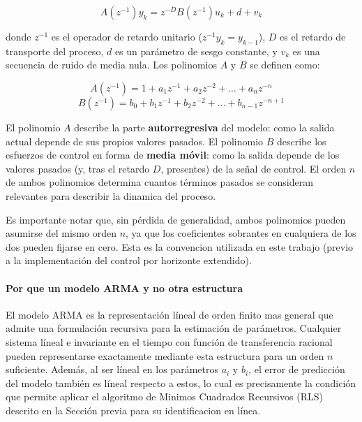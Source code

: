 \begin{equation}
    A(z^{-1})y_k = z^{-D}B(z^{-1})u_k + d + v_k
    \label{eq:arma}
\end{equation}

donde $z^{-1}$ es el operador de retardo unitario ($z^{-1}y_k = y_{k-1}$), $D$ es el retardo de transporte del proceso, $d$ es un parámetro de sesgo constante, y $v_k$ es una secuencia de ruido de media nula. Los polinomios $A$ y $B$ se definen como:

\begin{equation}
    A(z^{-1}) = 1 + a_1 z^{-1} + a_2 z^{-2} + \ldots + a_n z^{-n}
\end{equation}
\begin{equation}
    B(z^{-1}) = b_0 + b_1 z^{-1} + b_2 z^{-2} + \ldots + b_{n-1} z^{-n+1}
\end{equation}

El polinomio $A$ describe la parte \textbf{autorregresiva} del modelo: como la salida actual depende de sus propios valores pasados. El polinomio $B$ describe los esfuerzos de control en forma de \textbf{media móvil}: como la salida depende de los valores pasados (y, tras el retardo $D$, presentes) de la señal de control. El orden $n$ de ambos polinomios determina cuantos términos pasados se consideran relevantes para describir la dinamica del proceso.

Es importante notar que, sin pérdida de generalidad, ambos polinomios pueden asumirse del mismo orden $n$, ya que los coeficientes sobrantes en cualquiera de
los dos pueden fijarse en cero. Esta es la convencion utilizada en este trabajo (previo a la implementación del control por horizonte extendido).

\paragraph{Por que un modelo ARMA y no otra estructura}

El modelo ARMA es la representación líneal de orden finito mas general que admite una formulación recursiva para la estimación de parámetros. Cualquier sistema líneal e invariante en el tiempo con función de transferencia racional pueden representarse exactamente mediante esta estructura para un orden $n$ suficiente. Además, al ser líneal en los parámetros $a_i$ y $b_i$, el error de predicción del
modelo también es líneal respecto a estos, lo cual es precisamente la condición que permite aplicar el algoritmo de Minimos Cuadrados Recursivos (RLS) descrito en
la Sección previa para su identificacion en línea.


